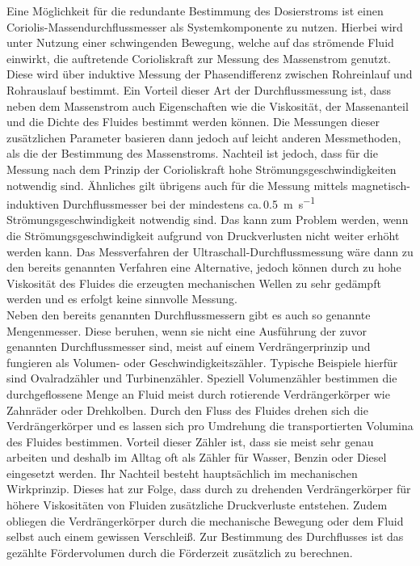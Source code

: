 Eine Möglichkeit für die redundante Bestimmung des Dosierstroms ist einen Coriolis-Massendurchflussmesser als Systemkomponente zu nutzen. Hierbei wird unter Nutzung einer schwingenden Bewegung, welche auf das strömende Fluid einwirkt, die auftretende Corioliskraft zur Messung des Massenstrom genutzt. Diese wird über induktive Messung der Phasendifferenz zwischen Rohreinlauf und Rohrauslauf bestimmt. Ein Vorteil dieser Art der Durchflussmessung ist, dass neben dem Massenstrom auch Eigenschaften wie die Viskosität, der Massenanteil und die Dichte des Fluides bestimmt werden können. Die Messungen dieser zusätzlichen Parameter basieren dann jedoch auf leicht anderen Messmethoden, als die der Bestimmung des Massenstroms. \cite{Ignatowitz.2015}\linebreak
Nachteil ist jedoch, dass für die Messung nach dem Prinzip der Corioliskraft hohe Strömungsgeschwindigkeiten notwendig sind. Ähnliches gilt übrigens auch für die Messung mittels magnetisch-induktiven Durchflussmesser bei der mindestens ca.\,\SI{0,5}{\meter \per \second} Strömungsgeschwindigkeit notwendig sind. Das kann zum Problem werden, wenn die Strömungsgeschwindigkeit aufgrund von Druckverlusten nicht weiter erhöht werden kann. Das Messverfahren der Ultraschall-Durchflussmessung wäre dann zu den bereits genannten Verfahren eine Alternative, jedoch können durch zu hohe Viskosität des Fluides die erzeugten mechanischen Wellen zu sehr gedämpft werden und es erfolgt keine sinnvolle Messung. \cite{Stepanek.Unbekannt, Wikipedia.2021,Wikipedia.2020}\\
Neben den bereits genannten Durchflussmessern gibt es auch so genannte Mengenmesser. Diese beruhen, wenn sie nicht eine Ausführung der zuvor genannten Durchflussmesser sind, meist auf einem Verdrängerprinzip und fungieren als Volumen- oder Geschwindigkeitszähler. Typische Beispiele hierfür sind Ovalradzähler und Turbinenzähler. Speziell Volumenzähler bestimmen die durchgeflossene Menge an Fluid meist durch rotierende Verdrängerkörper wie Zahnräder oder Drehkolben. Durch den Fluss des Fluides drehen sich die Verdrängerkörper und es lassen sich pro Umdrehung die transportierten Volumina des Fluides bestimmen. Vorteil dieser Zähler ist, dass sie meist sehr genau arbeiten und deshalb im Alltag oft als Zähler für Wasser, Benzin  oder Diesel eingesetzt werden. \cite{Ignatowitz.2015}\linebreak
Ihr Nachteil besteht hauptsächlich im mechanischen Wirkprinzip. Dieses hat zur Folge, dass durch zu drehenden Verdrängerkörper für höhere Viskositäten von Fluiden zusätzliche Druckverluste entstehen. Zudem obliegen die Verdrängerkörper durch die mechanische Bewegung oder dem Fluid selbst auch einem gewissen Verschleiß. Zur Bestimmung des Durchflusses ist das gezählte Fördervolumen durch die Förderzeit zusätzlich zu berechnen.\\
